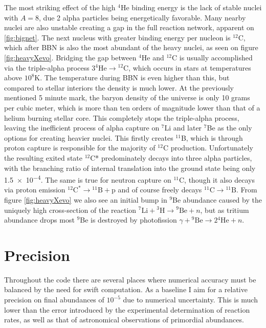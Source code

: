 The most striking effect of the high ${}^4$He binding energy is the lack of stable nuclei with $A=8$, due 2 alpha particles being energetically favorable. Many nearby nuclei are also unstable creating a gap in the full reaction network, apparent on \ref{fig:bignet}. The next nucleus with greater binding energy per nucleon is ${}^{12}$C, which after BBN is also the most abundant of the heavy nuclei, as seen on figure \ref{fig:heavyXevo}. Bridging the gap between ${}^4$He and ${}^{12}$C is usually accomplished via the triple-alpha process $3{}^4\text{He}\rightarrow {}^{12}\text{C}$, which occurs in stars at temperatures above $10^8$K. The temperature during BBN is even higher than this, but compared to stellar interiors the density is much lower. At the previously mentioned 5 minute mark, the baryon density of the universe is only 10 grams per cubic meter, which is more than ten orders of magnitude lower than that of a helium burning stellar core. This completely stops the triple-alpha process, leaving the inefficient process of alpha capture on ${}^7$Li and later ${}^7$Be as the only options for creating heavier nuclei. This firstly creates ${}^{11}$B, which is through proton capture is responsible for the majority of ${}^{12}$C production. Unfortunately the resulting exited state ${}^{12}$C* predominately decays into three alpha particles, with the branching ratio of internal translation into the ground state being only \num{1.5e-4}. The same is true for neutron capture on ${}^{11}$C, though it also decays via proton emission  ${}^{12}\text{C}^\ast \rightarrow {}^{11}\text{B}+\text{p}$ and of course freely decays ${}^{11}\text{C}\rightarrow {}^{11}\text{B}$. From figure \ref{fig:heavyXevo} we also see an initial bump in ${}^9$Be abundance caused by the uniquely high cross-section of the reaction ${}^7\text{Li}+{}^3\text{H}\rightarrow {}^9\text{Be}+n$, but as tritium abundance drops most ${}^9$Be is destroyed by photofission $\gamma+{}^9\text{Be}\rightarrow 2{}^4\text{He}+n$.


\section{Precision}

Throughout the code there are several places where numerical accuracy must be balanced by the need for swift computation. As a baseline I aim for a relative precision on final abundances of $10^{-5}$ due to numerical uncertainty. This is much lower than the error introduced by the experimental determination of reaction rates, as well as that of astronomical observations of primordial abundances. 

